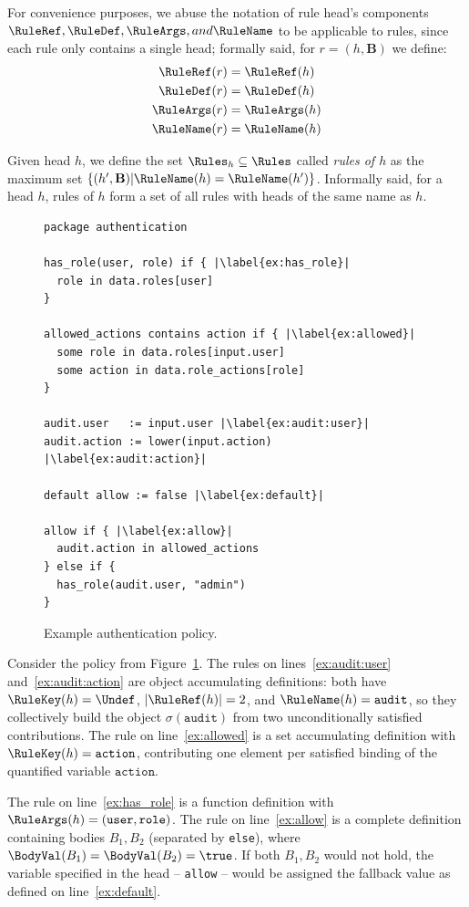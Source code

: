 For convenience purposes, we abuse the notation of rule head's components $\RuleRef,\RuleDef,\RuleArgs, and \RuleName$ to be applicable to rules, since each rule only contains a single head; formally said, for $r = (h,\mathbf{B})$ we define:
\begin{align*}
  \RuleRef(r) &= \RuleRef(h) \\
  \RuleDef(r) &= \RuleDef(h) \\
  \RuleArgs(r) &= \RuleArgs(h) \\
  \RuleName(r) &= \RuleName(h)
\end{align*}

Given head $h$, we define the set $\Rules_h \subseteq \Rules$ called \emph{rules of $h$} as the maximum set $\{(h',\mathbf{B})|\RuleName(h) = \RuleName(h')\}$.
Informally said, for a head $h$, rules of $h$ form a set of all rules with heads of the same name as $h$.

\begin{figure}
  \label{fig:ex:auth}
  \begin{lstlisting}[language=Rego,escapechar=|]
package authentication

has_role(user, role) if { |\label{ex:has_role}|
  role in data.roles[user]
}

allowed_actions contains action if { |\label{ex:allowed}|
  some role in data.roles[input.user]
  some action in data.role_actions[role]
}

audit.user   := input.user |\label{ex:audit:user}|
audit.action := lower(input.action) |\label{ex:audit:action}|

default allow := false |\label{ex:default}|

allow if { |\label{ex:allow}|
  audit.action in allowed_actions
} else if {
  has_role(audit.user, "admin")
}
\end{lstlisting}
  \caption{Example \rego authentication policy.}
\end{figure}

\begin{example}
  Consider the policy from Figure~\ref{fig:ex:auth}.
  The rules on lines~\ref{ex:audit:user} and~\ref{ex:audit:action} are object accumulating
  definitions: both have $\RuleKey(h) = \Undef$, $|\RuleRef(h)| = 2$, and $\RuleName(h) = \texttt{audit}$,
  so they collectively build the object $\sigma(\texttt{audit})$ from two unconditionally satisfied contributions.
  The rule on line~\ref{ex:allowed} is a set accumulating definition with
  $\RuleKey(h) = \texttt{action}$, contributing one element per satisfied binding of the quantified variable $\texttt{action}$.

  The rule on line~\ref{ex:has_role} is a function definition with
  $\RuleArgs(h) = (\texttt{user}, \texttt{role})$.
  The rule on line~\ref{ex:allow} is a complete definition containing bodies $B_1,B_2$ (separated by \texttt{else}), where $\BodyVal(B_1) = \BodyVal(B_2) = \true$.
  If both $B_1,B_2$ would not hold, the variable specified in the head -- \texttt{allow} -- would be assigned the fallback value \false as defined on line~\ref{ex:default}.
\end{example}

